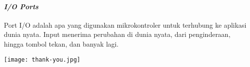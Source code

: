 \begin{frame}{\insertsectionhead}
	\framesubtitle{\textit{I/O Ports}}
	\justifying
	Port I/O adalah apa yang digunakan mikrokontroler untuk terhubung ke aplikasi dunia nyata. Input menerima perubahan di dunia nyata, dari penginderaan, hingga tombol tekan, dan banyak lagi.
	\vfill
	\begin{figure}[ht!]
		\begin{subfigure}[b]{0.4\textwidth}
		\end{subfigure}
	\end{figure}
\end{frame}

{
	\texttt{[image: thank-you.jpg]}
}
\begin{frame}[plain]
\end{frame}